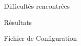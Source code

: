 \documentclass{book}
\begin{document}
	\begin{chapter}{Difficultés rencontrées}

	\end{chapter}

	\begin{chapter}{Résultats}

	\end{chapter}

	\appendix

	\begin{chapter}{Fichier de Configuration}

		\label{config file}
		

	\end{chapter}

	\backmatter


	\printindex


	\nocite{*}
	
	
\end{document}
